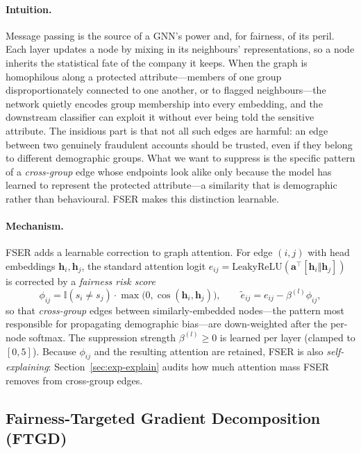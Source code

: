 \paragraph{Intuition.}
Message passing is the source of a GNN's power and, for fairness, of its
peril. Each layer updates a node by mixing in its neighbours' representations,
so a node inherits the statistical fate of the company it keeps. When the graph
is homophilous along a protected attribute---members of one group
disproportionately connected to one another, or to flagged neighbours---the
network quietly encodes group membership into every embedding, and the
downstream classifier can exploit it without ever being told the sensitive
attribute. The insidious part is that not all such edges are harmful: an edge
between two genuinely fraudulent accounts should be trusted, even if they belong
to different demographic groups. What we want to suppress is the specific
pattern of a \emph{cross-group} edge whose endpoints look alike only because the
model has learned to represent the protected attribute---a similarity that is
demographic rather than behavioural. FSER makes this distinction learnable.

\paragraph{Mechanism.}
FSER adds a learnable correction to graph attention. For edge $(i,j)$ with head
embeddings
$\mathbf{h}_i,\mathbf{h}_j$, the standard attention logit
$e_{ij}=\mathrm{LeakyReLU}(\mathbf{a}^\top[\mathbf{h}_i\Vert\mathbf{h}_j])$ is
corrected by a \emph{fairness risk score}
\begin{equation}
\phi_{ij}=\mathbb{I}(s_i\neq s_j)\cdot\max\!\big(0,\cos(\mathbf{h}_i,\mathbf{h}_j)\big),
\qquad
\tilde{e}_{ij}=e_{ij}-\beta^{(l)}\phi_{ij},
\end{equation}
so that \emph{cross-group} edges between similarly-embedded nodes---the pattern
most responsible for propagating demographic bias---are down-weighted after the
per-node softmax. The suppression strength $\beta^{(l)}\!\ge\!0$ is learned per
layer (clamped to $[0,5]$). Because $\phi_{ij}$ and the resulting attention are
retained, FSER is also \emph{self-explaining}: Section~\ref{sec:exp-explain}
audits how much attention mass FSER removes from cross-group edges.

\subsection{Fairness-Targeted Gradient Decomposition (FTGD)}
\label{sec:ftgd}

